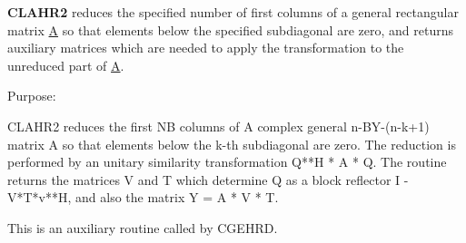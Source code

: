 {\bfseries C\+L\+A\+H\+R2} reduces the specified number of first columns of a general rectangular matrix \hyperlink{classA}{A} so that elements below the specified subdiagonal are zero, and returns auxiliary matrices which are needed to apply the transformation to the unreduced part of \hyperlink{classA}{A}. 

 \begin{DoxyParagraph}{Purpose\+: }
\begin{DoxyVerb} CLAHR2 reduces the first NB columns of A complex general n-BY-(n-k+1)
 matrix A so that elements below the k-th subdiagonal are zero. The
 reduction is performed by an unitary similarity transformation
 Q**H * A * Q. The routine returns the matrices V and T which determine
 Q as a block reflector I - V*T*v**H, and also the matrix Y = A * V * T.

 This is an auxiliary routine called by CGEHRD.\end{DoxyVerb}
 
\end{DoxyParagraph}


